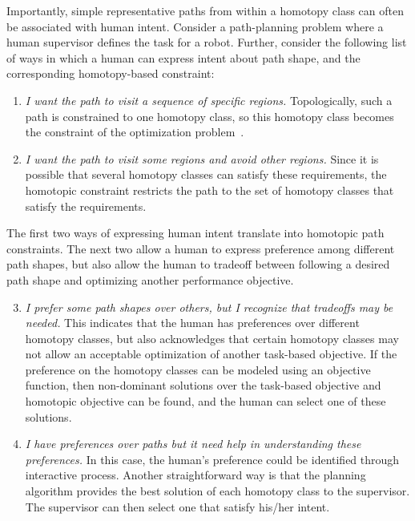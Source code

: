 \documentclass[letterpaper, 10 pt, conference]{ieeeconf}
\begin{document}
Importantly, simple representative paths from within a homotopy class can often be associated with human intent.
Consider a path-planning problem where a human supervisor defines the task for a robot.
Further, consider the following list of ways in which a human can express intent about path shape, and the corresponding homotopy-based constraint:
\begin{enumerate}
\item \emph{I want the path to visit a sequence of specific regions.}
Topologically, such a path is constrained to one homotopy class, so this homotopy class becomes the constraint of the optimization problem~\cite{Hershberger199463}.
\item \emph{I want the path to visit some regions and avoid other regions.}
Since it is possible that several homotopy classes can satisfy these requirements, the homotopic constraint restricts the path to  the set of homotopy classes that satisfy the requirements.
\end{enumerate}
The first two ways of expressing human intent translate into homotopic path constraints.
The next two allow a human to express preference among different path shapes, but also allow the human to tradeoff between following a desired path shape and optimizing another performance objective.
\begin{enumerate}
\setcounter{enumi}{2}
\item \emph{I prefer some path shapes over others, but I recognize that tradeoffs may be needed.} 
This indicates that the human has preferences over different homotopy classes, but also acknowledges that certain homotopy classes may not allow an acceptable optimization of another task-based objective.
If the preference on the homotopy classes can be modeled using an objective function, then non-dominant solutions over the task-based objective and homotopic objective can be found, and the human can select one of these solutions.
\item \emph{I have preferences over paths but it need help in understanding these preferences.}
In this case, the human's preference could be identified through interactive process.
Another straightforward way is that the planning algorithm provides the best solution of each homotopy class to the supervisor.
The supervisor can then select one that satisfy his/her intent.
\end{enumerate}
\end{document}
